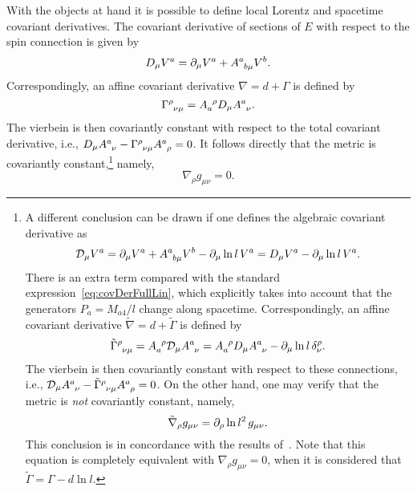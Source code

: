 \documentclass[
final,
11pt,
a4paper,
DIV=11,
headinclude=true,
footinclude=false,
bibliography=totoc,
twoside=true,  %
BCOR=5mm
]{scrbook}
\begin{document}
With the objects at hand it is possible to define local Lorentz 
and spacetime covariant derivatives. The covariant derivative of 
sections of $E$ with respect to the spin connection is given by
\begin{equation}
\label{eq:covDerFullLin}
  D_\mu V^a = \pd_\mu V^a + A\ind{^a_{b\mu}} V^b.
\end{equation}
Correspondingly, an affine covariant derivative $\nabla 
= d + \Gamma$ is defined by
\begin{equation*}
  \Gamma\ind{^\rho_{\nu\mu}} = A\ind{_a^\rho} D_\mu 
  A\ind{^a_\nu}.
\end{equation*}
The vierbein is then covariantly constant with respect to the 
total covariant derivative, i.e., $D_\mu A\ind{^a_\nu} 
- \Gamma\ind{^\rho_{\nu\mu}} A\ind{^a_\rho} = 0$. It follows 
directly that the metric is covariantly constant,\footnote{%
  A different conclusion can be drawn if one defines the 
  algebraic covariant derivative as
  \begin{equation*}
    \mc{D}_\mu V^a = \pd_\mu V^a + A\ind{^a_{b\mu}} V^b - \pd_\mu 
    \ln l\, V^a = D_\mu V^a - \pd_\mu \ln l\, V^a.
  \end{equation*}
  There is an extra term compared with the standard 
  expression~\ref{eq:covDerFullLin}, which explicitly takes into 
  account that the generators $P_a = M_{a4}/l$ change along 
  spacetime. Correspondingly, an affine covariant derivative 
  $\tilde{\nabla} = d + \tilde{\Gamma}$ is defined by
  \begin{equation*}
    \tilde{\Gamma}\ind{^\rho_{\nu\mu}} = A\ind{_a^\rho} 
    \mc{D}_\mu A\ind{^a_\nu} = A\ind{_a^\rho} D_\mu A\ind{^a_\nu} 
    - \pd_\mu \ln l\, \delta^\rho_\nu.
  \end{equation*}
  The vierbein is then covariantly constant with respect to these 
  connections, i.e., $\mc{D}_\mu A\ind{^a_\nu} 
  - \tilde{\Gamma}\ind{^\rho_{\nu\mu}} A\ind{^a_\rho} = 0$. On 
  the other hand, one may verify that the metric is \emph{not} 
  covariantly constant, namely,
  \begin{equation*}
    \tilde{\nabla}_\rho g_{\mu\nu} = \partial_\rho \ln l^2\, 
    g_{\mu\nu}.
  \end{equation*}
  This conclusion is in concordance with the results 
  of~\cite{Westman:2014yca}. Note that this equation is 
  completely equivalent with $\nabla_\rho g_{\mu\nu} = 0$, when 
  it is considered that $\tilde{\Gamma} = \Gamma - d \ln l$.
} namely,
\begin{equation*}
  \nabla_\rho g_{\mu\nu} = 0.
\end{equation*}
\end{document}
